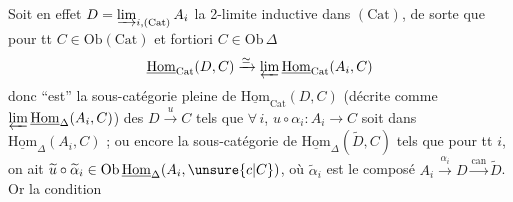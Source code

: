 Soit en effet $D=\varinjlim_{i,(\mathrm{Cat})}A_i$ la 2-limite inductive dans $(\mathrm{Cat})$, de sorte que pour tt $C\in\mathrm{Ob}(\mathrm{Cat})$ et  fortiori $C\in\mathrm{Ob}\,\Delta$
\[
\underline{\mathrm{Hom}}_{\mathrm{Cat}}(D,C)\xrightarrow{\simeq}\varprojlim\underline{\mathrm{Hom}}_{\mathrm{Cat}}(A_i,C)
\]
donc  ``est'' la sous-catégorie pleine de  $\underline{\mathrm{Hom}}_{\mathrm{Cat}}(D,C)$  (décrite comme $\varprojlim\underline{\mathrm{Hom}}_{\Delta}(A_i,C)$) des $D\xrightarrow{u}C$  tels que $\forall\,i$, $u\circ\alpha_i:A_i\to C$ soit dans $\underline{\mathrm{Hom}}_{\Delta}(A_i,C)$ ;  ou encore la sous-catégorie de $\underline{\mathrm{Hom}}_{\Delta}(\widetilde D,C)$  tels que pour tt $i$, on ait $\widetilde u\circ\widetilde\alpha_i\in\mathrm{Ob}\,\underline{\mathrm{Hom}}_{\Delta}(A_i,\unsure{c|C})$\unsure{\})|)\}}, où $\widetilde\alpha_i$ est le composé $A_i\xrightarrow{\alpha_i}D\xrightarrow{\mathrm{can}}\widetilde D$. Or la condition
